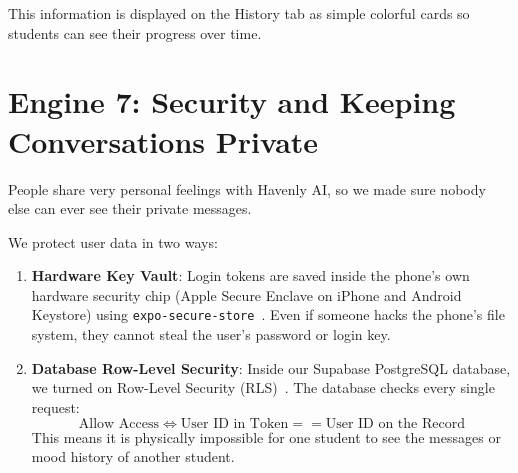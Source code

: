 This information is displayed on the History tab as simple colorful cards so students can see their progress over time.

\section{Engine 7: Security and Keeping Conversations Private}
\label{sec:arch_engine7}

People share very personal feelings with Havenly AI, so we made sure nobody else can ever see their private messages.

We protect user data in two ways:
\begin{enumerate}
    \item \textbf{Hardware Key Vault}: Login tokens are saved inside the phone's own hardware security chip (Apple Secure Enclave on iPhone and Android Keystore) using \texttt{expo-secure-store}~\cite{apple2023secureenclave}. Even if someone hacks the phone's file system, they cannot steal the user's password or login key.
    \item \textbf{Database Row-Level Security}: Inside our Supabase PostgreSQL database, we turned on Row-Level Security (RLS)~\cite{supabase2024rls}. The database checks every single request:
    \begin{equation}
    \label{eq:rls_rule}
    \text{Allow Access} \iff \text{User ID in Token} == \text{User ID on the Record}
    \end{equation}
    This means it is physically impossible for one student to see the messages or mood history of another student.
\end{enumerate}
